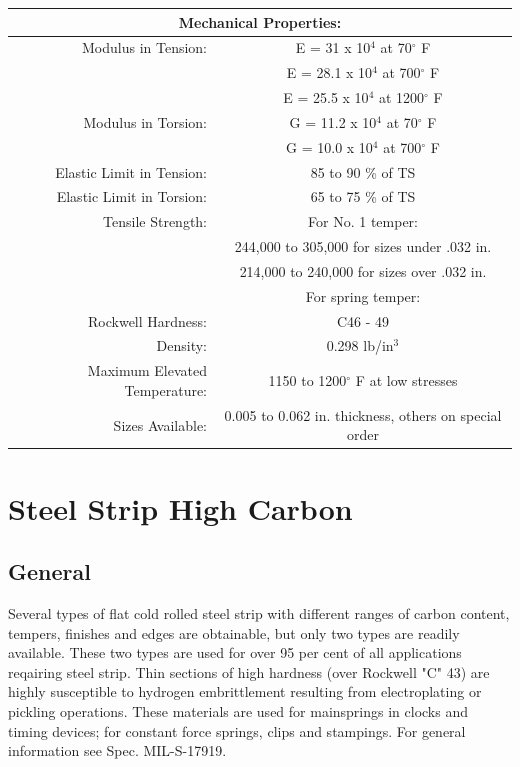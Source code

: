 \documentclass[10pt]{article}
\begin{document}
\begin{center}
\begin{tabular}{ r c }
\multicolumn{2}{c}{Mechanical Properties:} \\
\hline
Modulus in Tension: & E = 31 x 10$^4$ at 70$^\circ$ F \\  
& E = 28.1 x 10$^4$ at 700$^\circ$ F \\ 

& E = 25.5 x 10$^4$ at 1200$^\circ$ F \\ 

Modulus in Torsion: & G = 11.2 x 10$^4$ at 70$^\circ$ F \\
& G = 10.0 x 10$^4$ at 700$^\circ$ F \\

Elastic Limit in Tension: & 85 to 90 \% of TS \\  
Elastic Limit in Torsion: & 65 to 75 \% of TS \\
Tensile Strength: & For No. 1 temper: \\
& 244,000 to 305,000 for sizes under .032 in. \\
& 214,000 to 240,000 for sizes over .032 in. \\
& For spring temper: \\
Rockwell Hardness: & C46 - 49 \\
Density: & 0.298 lb/in$^3$ \\
Maximum Elevated Temperature: & 1150 to 1200$^\circ$ F at low stresses\\
Sizes Available: & 0.005 to 0.062 in. thickness, others on special order \\
\hline
\end{tabular}
\end{center}

\clearpage
\section{Steel Strip High Carbon} %
\subsection{General} %
Several types of flat cold rolled steel strip with different ranges of carbon content, tempers, finishes and edges are obtainable, but only two types are readily available.
These two types are used for over 95 per cent of all applications reqairing steel strip. 
Thin sections of high hardness (over Rockwell "C" 43) are highly susceptible to hydrogen embrittlement resulting from electroplating or pickling operations. 
These materials are used for mainsprings in clocks and timing devices; for constant force springs, clips and stampings. 
For general information see Spec. MIL-S-17919.
\end{document}

